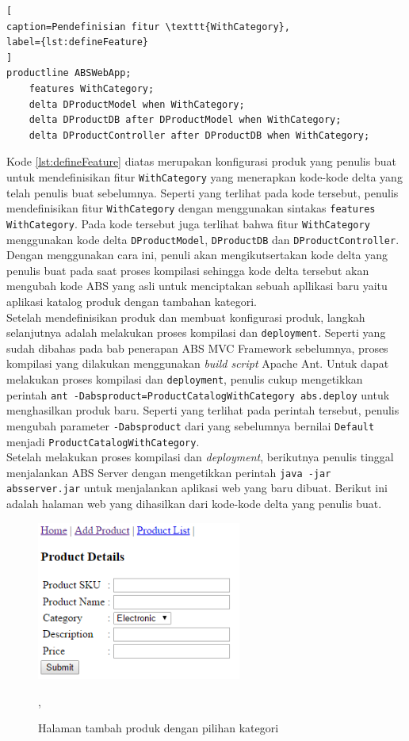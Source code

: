 \begin{lstlisting}[
caption=Pendefinisian fitur \texttt{WithCategory},
label={lst:defineFeature}
]
productline ABSWebApp;
	features WithCategory;
	delta DProductModel when WithCategory;
	delta DProductDB after DProductModel when WithCategory;
	delta DProductController after DProductDB when WithCategory;
\end{lstlisting}

Kode \ref{lst:defineFeature} diatas merupakan konfigurasi produk yang penulis buat untuk mendefinisikan fitur \texttt{WithCategory} yang menerapkan kode-kode delta yang telah penulis buat sebelumnya. Seperti yang terlihat pada kode tersebut, penulis mendefinisikan fitur \texttt{WithCategory} dengan menggunakan sintakas \texttt{features WithCategory}. Pada kode tersebut juga terlihat bahwa fitur \texttt{WithCategory} menggunakan kode delta \texttt{DProductModel}, \texttt{DProductDB} dan \texttt{DProductController}. Dengan menggunakan cara ini, penuli akan mengikutsertakan kode delta yang penulis buat pada saat proses kompilasi sehingga kode delta tersebut akan mengubah kode ABS yang asli untuk menciptakan sebuah apllikasi baru yaitu aplikasi katalog produk dengan tambahan kategori.\\

Setelah mendefinisikan produk dan membuat konfigurasi produk, langkah selanjutnya adalah melakukan proses kompilasi dan \texttt{deployment}. Seperti yang sudah dibahas pada bab penerapan ABS MVC Framework sebelumnya, proses kompilasi yang dilakukan menggunakan \textit{build script} Apache Ant. Untuk dapat melakukan proses kompilasi dan \texttt{deployment}, penulis cukup mengetikkan perintah \texttt{ant -Dabsproduct=ProductCatalogWithCategory abs.deploy} untuk menghasilkan produk baru. Seperti yang terlihat pada perintah tersebut, penulis mengubah parameter \texttt{-Dabsproduct} dari yang sebelumnya bernilai \texttt{Default} menjadi \texttt{ProductCatalogWithCategory}.\\

Setelah melakukan proses kompilasi dan \textit{deployment}, berikutnya penulis tinggal menjalankan ABS Server dengan mengetikkan perintah \texttt{java -jar absserver.jar} untuk menjalankan aplikasi web yang baru dibuat. Berikut ini adalah halaman web yang dihasilkan dari kode-kode delta yang penulis buat.

\begin{figure}
    \centering
    \includegraphics[width=0.6\textwidth]{img/add-product-withCategory}
    \caption{Halaman tambah produk dengan pilihan kategori},
    \label{fig:addProductWithCategory}
\end{figure}

